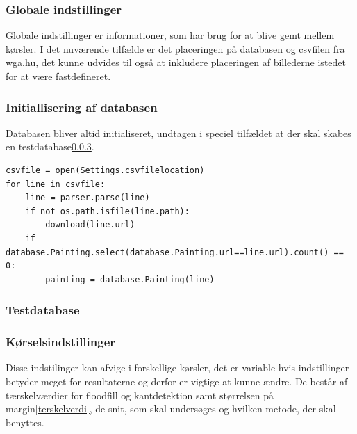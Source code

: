 {\subsubsection{Globale indstillinger}
Globale indstillinger er informationer, som har brug for at blive gemt
mellem kørsler. I det nuværende tilfælde er det placeringen på databasen og
csvfilen fra wga.hu, det kunne udvides til også at inkludere placeringen
af billederne istedet for at være fastdefineret.
\subsubsection{Initiallisering af databasen}
Databasen bliver altid initialiseret, undtagen i speciel tilfældet at
der skal skabes en testdatabase\ref{test_db}. 
\begin{lstlisting}[caption={Pseudokode for database
initialisering},frame=tb,label={pseudo_init_db}]
csvfile = open(Settings.csvfilelocation)
for line in csvfile:
	line = parser.parse(line)
	if not os.path.isfile(line.path):
		download(line.url)
	if database.Painting.select(database.Painting.url==line.url).count() == 0:
		painting = database.Painting(line)
\end{lstlisting}
\subsubsection{Testdatabase}\label{test_db}
\subsubsection{Kørselsindstillinger}
Disse indstilinger kan afvige i forskellige kørsler, det er variable
hvis indstillinger betyder meget for resultaterne og derfor er vigtige
at kunne ændre. De består af tærskelværdier for floodfill og
kantdetektion samt størrelsen på margin\ref{terskelverdi}, de snit, som
skal undersøges og hvilken metode, der skal benyttes.
}
